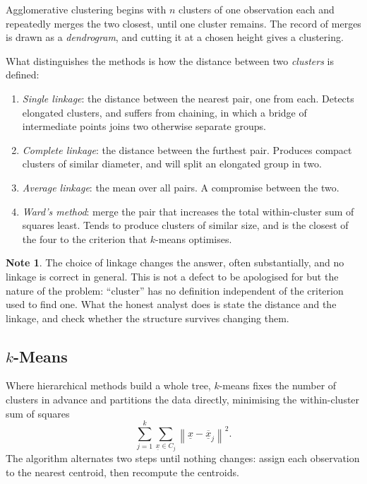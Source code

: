 \documentclass[11pt,a4paper]{article}
\theoremstyle{definition}
\newtheorem{note}[thm]{Note}
\begin{document}
Agglomerative clustering begins with $n$ clusters of one observation each and
repeatedly merges the two closest, until one cluster remains. The record of
merges is drawn as a \emph{dendrogram}, and cutting it at a chosen height gives
a clustering.

What distinguishes the methods is how the distance between two \emph{clusters}
is defined:

\begin{enumerate}
\item[(i)] \emph{Single linkage}: the distance between the nearest pair, one
from each. Detects elongated clusters, and suffers from chaining, in which a
bridge of intermediate points joins two otherwise separate groups.
\item[(ii)] \emph{Complete linkage}: the distance between the furthest pair.
Produces compact clusters of similar diameter, and will split an elongated group
in two.
\item[(iii)] \emph{Average linkage}: the mean over all pairs. A compromise
between the two.
\item[(iv)] \emph{Ward's method}: merge the pair that increases the total
within-cluster sum of squares least. Tends to produce clusters of similar size,
and is the closest of the four to the criterion that $k$-means optimises.
\end{enumerate}

\begin{note}
The choice of linkage changes the answer, often substantially, and no linkage is
correct in general. This is not a defect to be apologised for but the nature of
the problem: ``cluster'' has no definition independent of the criterion used to
find one. What the honest analyst does is state the distance and the linkage,
and check whether the structure survives changing them.
\end{note}

\subsection{$k$-Means}

Where hierarchical methods build a whole tree, $k$-means fixes the number of
clusters in advance and partitions the data directly, minimising the
within-cluster sum of squares
$$\sum^{k}_{j=1}\sum_{\underline{x}\in C_j}
\left\|\underline{x}-\overline{\underline{x}}_j\right\|^{2}.$$
The algorithm alternates two steps until nothing changes: assign each
observation to the nearest centroid, then recompute the centroids.
\end{document}
